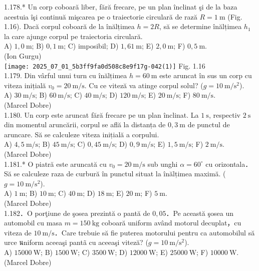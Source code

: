 1.178.* Un corp coboară liber, fără frecare, pe un plan înclinat şi de la baza acestuia îşi continuă mişcarea pe o traiectorie circulară de rază $R=1 \mathrm{~m}$ (Fig. 1.16). Dacă corpul coboară de la înălțimea $h=2 R$, să se determine înălțimea $h_{1}$ la care ajunge corpul pe traiectoria circulară.\\ A) $1,0 \mathrm{~m}$; B) $0,1 \mathrm{~m}$; C) imposibil; D) $1,61 \mathrm{~m}$; E) $2,0 \mathrm{~m}$; F) $0,5 \mathrm{~m}$.\\ (Ion Gurgu)\\ \texttt{[image: 2025\_07\_01\_5b3ff9fa0d508c8e9f17g-042(1)]} Fig. 1.16\\

1.179. Din vârful unui turn cu înălțimea $h=60 \mathrm{~m}$ este aruncat în sus un corp cu viteza inițială $v_{0}=20 \mathrm{~m} / \mathrm{s}$. Cu ce viteză va atinge corpul solul? ($g=10 \mathrm{~m} / \mathrm{s}^{2}$).\\ A) $30 \mathrm{~m} / \mathrm{s}$; B) $60 \mathrm{~m} / \mathrm{s}$; C) $40 \mathrm{~m} / \mathrm{s}$; D) $120 \mathrm{~m} / \mathrm{s}$; E) $20 \mathrm{~m} / \mathrm{s}$; F) $80 \mathrm{~m} / \mathrm{s}$.\\ (Marcel Dobre)\\

1.180. Un corp este aruncat fără frecare pe un plan înclinat. La $1 \mathrm{~s}$, respectiv $2 \mathrm{~s}$ din momentul aruncării, corpul se află la distanța de $0,3 \mathrm{~m}$ de punctul de aruncare. Să se calculeze viteza inițială a corpului.\\ A) $4,5 \mathrm{~m} / \mathrm{s}$; B) $45 \mathrm{~m} / \mathrm{s}$; C) $0,45 \mathrm{~m} / \mathrm{s}$; D) $0,9 \mathrm{~m} / \mathrm{s}$; E) $1,5 \mathrm{~m} / \mathrm{s}$; F) $2 \mathrm{~m} / \mathrm{s}$.\\ (Marcel Dobre)\\

1.181.* O piatră este aruncată cu $v_{0}=20 \mathrm{~m} / \mathrm{s}$ sub unghi $\alpha=60^{\circ}$ cu orizontala．Să se calculeze raza de curbură în punctul situat la înălțimea maximă. ($g=10 \mathrm{~m} / \mathrm{s}^{2}$).\\ A) $1 \mathrm{~m}$; B) $10 \mathrm{~m}$; C) $40 \mathrm{~m}$; D) $18 \mathrm{~m}$; E) $20 \mathrm{~m}$; F) $5 \mathrm{~m}$.\\ (Marcel Dobre)\\

1.182．O porţiune de şosea prezintă o pantă de $0,05$．Pe această şosea un automobil cu masa $m=150 \mathrm{~kg}$ coboară uniform având motorul decuplat，cu viteza de $10 \mathrm{~m} / \mathrm{s}$．Care trebuie să fie puterea motorului pentru ca automobilul să urce นniform aceeaşi pantã cu aceeaşi viteză? ($g=10 \mathrm{~m} / \mathrm{s}^{2}$).\\ A) $15000 \mathrm{~W}$; B) $1500 \mathrm{~W}$; C) $3500 \mathrm{~W}$; D) $12000 \mathrm{~W}$; E) $25000 \mathrm{~W}$; F) $10000 \mathrm{~W}$.\\ (Marcel Dobre)\\

